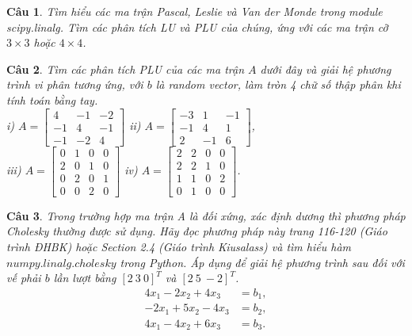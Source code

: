 \documentclass[11pt]{article}
\newtheorem{bt}{Câu}
\newcommand{\m}[1]{\begin{bmatrix}
		#1
\end{bmatrix}}
\begin{document}
\begin{bt}
	Tìm hiểu các ma trận Pascal, Leslie và Van der Monde trong module scipy.linalg. Tìm các phân tích LU và PLU của chúng, ứng với các ma trận cỡ $3\times 3$ hoặc $4 \times 4$.
\end{bt}


\newpage 

\begin{bt} Tìm các phân tích PLU của các ma trận $A$ dưới đây và giải hệ phương trình vi phân tương ứng, với $b$ là random vector, làm tròn 4 chữ số thập phân khi tính toán bằng tay. \\
i) $A = \m{4 & -1 & -2 \\ -1 & 4 & -1 \\ -1 & -2 & 4}$ \qquad ii) $A = \m{-3 & 1 & -1 \\ -1 & 4 & 1 \\ 2 & -1 & 6}$, \\
iii) $A = \m{0 & 1 & 0 & 0  \\ 2 & 0 & 1 & 0  \\ 0 & 2 & 0 & 1 \\ 0 & 0 & 2 & 0}$ \qquad iv) $A = \m{2 & 2 & 0 & 0  \\ 2 & 2 & 1 & 0  \\ 1 & 1 & 0 & 2 \\ 0 & 1 & 0 & 0}$.	
\end{bt}

\begin{bt}
Trong trường hợp ma trận A là đối xứng, xác định dương thì phương pháp Cholesky thường được sử dụng. Hãy đọc phương pháp này trang 116-120 (Giáo trình ĐHBK) hoặc Section 2.4 (Giáo trình Kiusalass) và tìm hiểu hàm $numpy.linalg.cholesky$ trong Python. Áp dụng để giải hệ phương trình sau đối với vế phải $b$ lần lượt bằng $[2 \ 3 \ 0]^T$ và $[2 \ 5 \ -2]^T$.
	\begin{align*}
	4 x_1 - 2 x_2 + 4 x_3   &= b_1, \\
	-2 x_1 + 5 x_2 - 4 x_3  &= b_2, \\
	4 x_1  -4 x_2 + 6 x_3   &= b_3. 
	\end{align*}
\end{bt}





\end{document}
